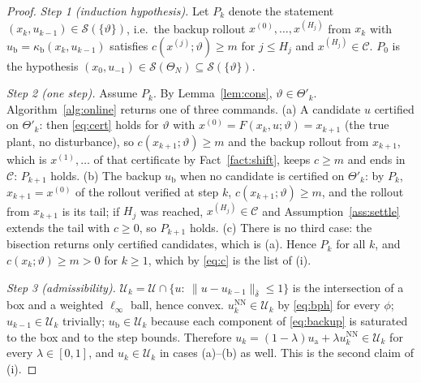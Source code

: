 \documentclass[final,5p,times,twocolumn]{elsarticle}
\begin{document}
\begin{proof}
\emph{Step 1 (induction hypothesis).} Let $P_k$ denote the statement $(x_k,u_{k-1})\in\mathcal S(\{\vartheta\})$, i.e.\ the backup rollout $x^{(0)},\dots,x^{(H_j)}$ from $x_k$ with $u_{\mathrm b}=\kappa_{\mathrm b}(x_k,u_{k-1})$ satisfies $c(x^{(j)};\vartheta)\ge m$ for $j\le H_j$ and $x^{(H_j)}\in\mathcal C$. $P_0$ is the hypothesis $(x_0,u_{-1})\in\mathcal S(\Theta_N)\subseteq\mathcal S(\{\vartheta\})$.

\emph{Step 2 (one step).} Assume $P_k$. By Lemma~\ref{lem:cons}, $\vartheta\in\Theta'_k$. Algorithm~\ref{alg:online} returns one of three commands. (a) A candidate $u$ certified on $\Theta'_k$: then \eqref{eq:cert} holds for $\vartheta$ with $x^{(0)}=F(x_k,u;\vartheta)=x_{k+1}$ (the true plant, no disturbance), so $c(x_{k+1};\vartheta)\ge m$ and the backup rollout from $x_{k+1}$, which is $x^{(1)},\dots$ of that certificate by Fact~\ref{fact:shift}, keeps $c\ge m$ and ends in $\mathcal C$: $P_{k+1}$ holds. (b) The backup $u_{\mathrm b}$ when no candidate is certified on $\Theta'_k$: by $P_k$, $x_{k+1}=x^{(0)}$ of the rollout verified at step $k$, $c(x_{k+1};\vartheta)\ge m$, and the rollout from $x_{k+1}$ is its tail; if $H_j$ was reached, $x^{(H_j)}\in\mathcal C$ and Assumption~\ref{ass:settle} extends the tail with $c\ge0$, so $P_{k+1}$ holds. (c) There is no third case: the bisection returns only certified candidates, which is (a). Hence $P_k$ for all $k$, and $c(x_k;\vartheta)\ge m>0$ for $k\ge1$, which by \eqref{eq:c} is the list of (i).

\emph{Step 3 (admissibility).} $\mathcal U_k=\mathcal U\cap\{u:\ \|u-u_{k-1}\|_{\bar\delta}\le1\}$ is the intersection of a box and a weighted $\ell_\infty$ ball, hence convex. $u^{\mathrm{NN}}_k\in\mathcal U_k$ by \eqref{eq:bph} for every $\phi$; $u_{k-1}\in\mathcal U_k$ trivially; $u_{\mathrm b}\in\mathcal U_k$ because each component of \eqref{eq:backup} is saturated to the box and to the step bounds. Therefore $u_k=(1-\lambda)u_{\mathrm a}+\lambda u^{\mathrm{NN}}_k\in\mathcal U_k$ for every $\lambda\in[0,1]$, and $u_k\in\mathcal U_k$ in cases (a)--(b) as well. This is the second claim of (i).


\end{proof}
\end{document}
